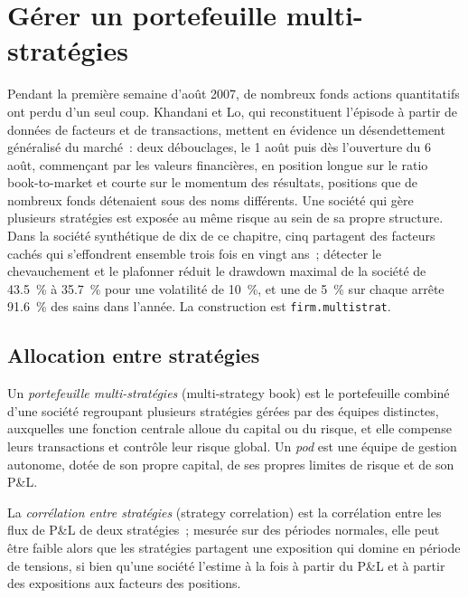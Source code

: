 \chapter{Gérer un portefeuille multi-stratégies}\label{ch:s1:running-a-multi-strategy-book}

Pendant la première semaine d'août 2007, de nombreux fonds actions quantitatifs ont perdu d'un seul coup. Khandani et Lo, qui reconstituent l'épisode à partir de données de facteurs et de transactions,
mettent en évidence un désendettement généralisé du marché~: deux débouclages, le 1 août puis dès l'ouverture du 6 août, commençant par les valeurs financières, en position longue sur le ratio book-to-market et courte sur le
momentum des résultats, positions que de nombreux fonds détenaient sous des noms différents. Une société qui gère plusieurs stratégies est exposée au même risque au sein de
sa propre structure. Dans la société synthétique de dix  de ce chapitre, cinq partagent des facteurs cachés qui s'effondrent ensemble trois fois en vingt ans~; détecter le chevauchement
et le plafonner réduit le drawdown maximal de la société de 43.5~\% à 35.7~\% pour une volatilité de 10~\%, et une  de 5~\% sur chaque  arrête 91.6~\% des
 sains dans l'année. La construction est \texttt{firm.multistrat}.

\section{Allocation entre stratégies}

\begin{definition}\label{def:s1:running-a-multi-strategy-book:multi}
Un \emph{portefeuille multi-stratégies} (multi-strategy book) est le portefeuille combiné d'une société regroupant plusieurs stratégies gérées par des équipes distinctes, auxquelles une fonction centrale alloue du capital ou
du risque, et elle compense leurs transactions et contrôle leur risque global. Un \emph{pod} est une équipe de gestion autonome, dotée de son propre capital, de ses
propres limites de risque et de son P\&L.
\end{definition}

\begin{definition}\label{def:s1:running-a-multi-strategy-book:correlation}
La \emph{corrélation entre stratégies} (strategy correlation) est la corrélation entre les flux de P\&L de deux stratégies~; mesurée sur des périodes normales, elle peut
être faible alors que les stratégies partagent une exposition qui domine en période de tensions, si bien qu'une société l'estime à la fois à partir du P\&L et à partir des expositions aux facteurs des positions.
\end{definition}


